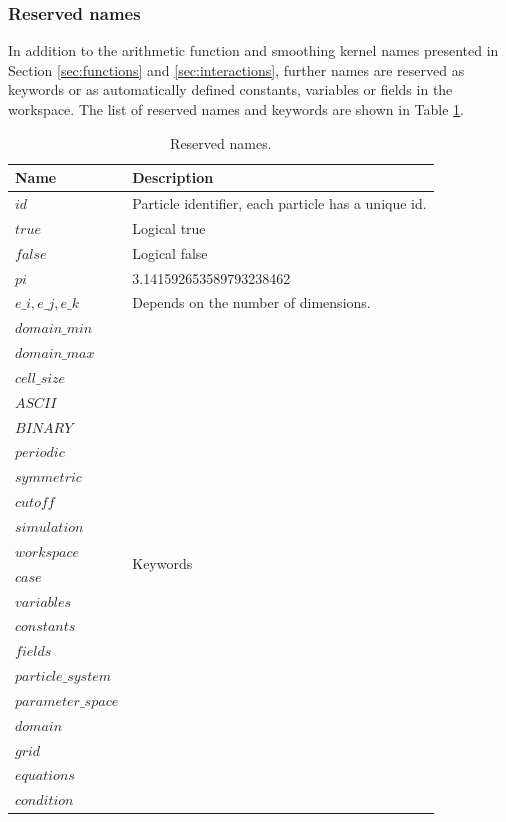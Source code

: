 \documentclass[a4paper,12pt,openany]{book}
\theoremstyle{break}
\begin{document}
\subsubsection{Reserved names}
In addition to the arithmetic function and smoothing kernel names presented in Section \ref{sec:functions} and \ref{sec:interactions}, further names are reserved as keywords or as automatically defined constants, variables or fields in the workspace. The list of reserved names and keywords are shown in Table \ref{tbl:reserved}.
\begin{table} [H]
\begin{center}
\caption{Reserved names.} \label{tbl:reserved}
\begin{tabular}{ l l }
\toprule[1.5pt]
\bf Name & \bf Description\\
\midrule
$id$ & Particle identifier, each particle has a unique id. \\
$true$ & Logical true\\
$false$ & Logical false  \\
$pi$ & 3.141592653589793238462\\
$e\_i, e\_j, e\_k$ & Depends on the number of dimensions. \\
\bottomrule[1.25pt]
$domain\_min$ & \multirow{20}{*}{Keywords}\\
$domain\_max$ & \\
$cell\_size$ & \\
$ASCII$ & \\
$BINARY$ & \\
$periodic$ & \\
$symmetric$ & \\
$cutoff$ & \\
$simulation$ & \\
$workspace$ & \\
$case$ & \\
$variables$ & \\
$constants$ & \\
$fields$ & \\
$particle\_system$ & \\
$parameter\_space$ & \\
$domain$ & \\
$grid$ & \\
$equations$ & \\
$condition$ & \\
\bottomrule[1.25pt]
\end{tabular}
\end{center}
\end{table}
\end{document}
